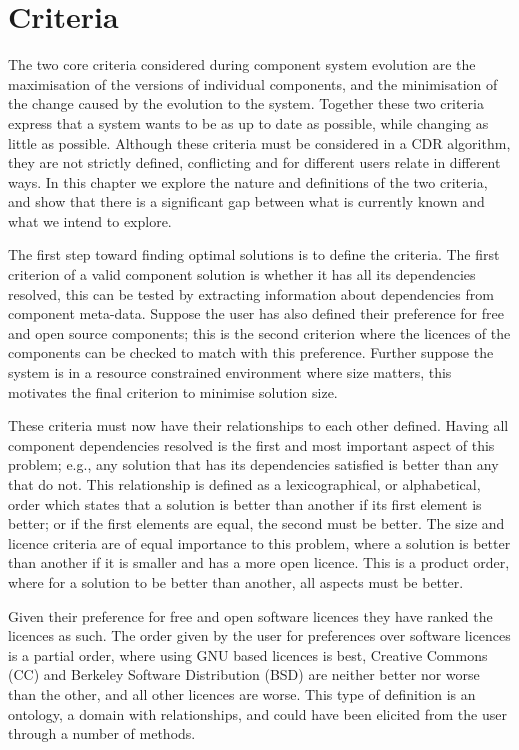 \chapter{Criteria}
\label{criteria}
{}The two core criteria considered during component system evolution are the maximisation of the versions of individual components, 
{}and the minimisation of the change caused by the evolution to the system.
{}Together these two criteria express that a system wants to be as up to date as possible, while changing as little as possible.
{}Although these criteria must be considered in a CDR algorithm,
{}they are not strictly defined, conflicting and for different users relate in different ways.
{}In this chapter we explore the nature and definitions of the two criteria,
{}and show that there is a significant gap between what is currently known and what we intend to explore. 

The first step toward finding optimal solutions is to define the criteria.
The first criterion of a valid component solution is whether it has all its dependencies resolved,
this can be tested by extracting information about dependencies from component meta-data.
Suppose the user has also defined their preference for free and open source components;
this is the second criterion where the licences of the components can be checked to match with this preference.
Further suppose the system is in a resource constrained environment where size matters, 
this motivates the final criterion to minimise solution size.

These criteria must now have their relationships to each other defined.
Having all component dependencies resolved is the first and most important aspect of this problem;
e.g., any solution that has its dependencies satisfied is better than any that do not. 
This relationship is defined as a lexicographical, or alphabetical, order which states that a solution is better than another if 
its first element is better; or if the first elements are equal, the second must be better.
The size and licence criteria are of equal importance to this problem, 
where a solution is better than another if it is smaller and has a more open licence. 
This is a product order, where for a solution to be better than another, all aspects must be better.

Given their preference for free and open software licences they have ranked the licences as such.
The order given by the user for preferences over software licences is a partial order,
where using GNU based licences is best, 
Creative Commons (CC) and Berkeley Software Distribution (BSD) are neither better nor worse than the other,
and all other licences are worse.
This type of definition is an ontology, a domain with relationships, and could have been elicited from the user through a number of methods.


